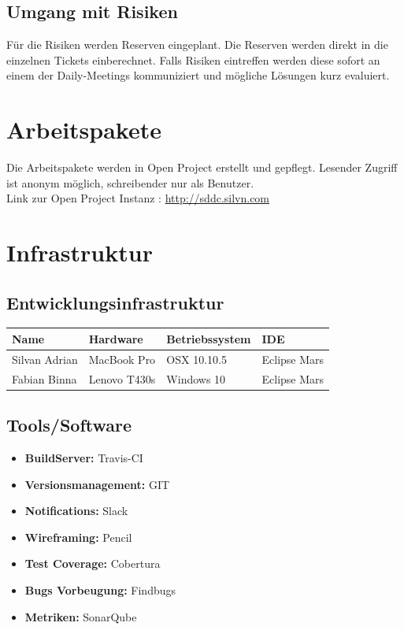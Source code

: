\documentclass[11pt]{scrartcl}
\begin{document}
\subsection{Umgang mit Risiken}
Für die Risiken werden Reserven eingeplant. Die Reserven werden direkt in die einzelnen Tickets 
einberechnet. Falls Risiken eintreffen werden diese sofort an einem der Daily-Meetings kommuniziert 
und mögliche Lösungen kurz evaluiert.
\section{Arbeitspakete}

Die Arbeitspakete werden in Open Project erstellt und gepflegt.
Lesender Zugriff ist anonym möglich, schreibender nur als Benutzer. 
\\
Link zur Open Project Instanz : \href{http://sddc.silvn.com}{http://sddc.silvn.com}

\section{Infrastruktur}

\subsection{Entwicklungsinfrastruktur}

\begin{tabularx}{\textwidth}{X X X X}
\textbf{Name} & \textbf{Hardware} & \textbf{Betriebssystem} & \textbf{IDE} \\
\hline
Silvan Adrian & MacBook Pro & OSX 10.10.5 &  Eclipse Mars \\
\hline
Fabian Binna & Lenovo T430s & Windows 10 &  Eclipse Mars\\
\hline
\end{tabularx}

\subsection{Tools/Software}
\begin{itemize}
    \item \textbf{BuildServer:} Travis-CI
    \item \textbf{Versionsmanagement:} GIT
    \item \textbf{Notifications:} Slack
    \item \textbf{Wireframing:} Pencil
    \item \textbf{Test Coverage:} Cobertura
    \item \textbf{Bugs Vorbeugung:} Findbugs
    \item \textbf{Metriken:} SonarQube
\end{itemize}
\end{document}
